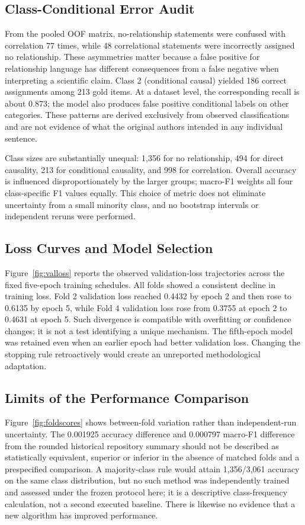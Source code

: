 \documentclass[conference]{IEEEtran}
\begin{document}
\subsection{Class-Conditional Error Audit}
From the pooled OOF matrix, no-relationship statements were confused with correlation 77 times, while 48 correlational statements were incorrectly assigned no relationship. These asymmetries matter because a false positive for relationship language has different consequences from a false negative when interpreting a scientific claim. Class 2 (conditional causal) yielded 186 correct assignments among 213 gold items. At a dataset level, the corresponding recall is about 0.873; the model also produces false positive conditional labels on other categories. These patterns are derived exclusively from observed classifications and are not evidence of what the original authors intended in any individual sentence.

Class sizes are substantially unequal: 1,356 for no relationship, 494 for direct causality, 213 for conditional causality, and 998 for correlation. Overall accuracy is influenced disproportionately by the larger groups; macro-F1 weights all four class-specific F1 values equally. This choice of metric does not eliminate uncertainty from a small minority class, and no bootstrap intervals or independent reruns were performed.

\subsection{Loss Curves and Model Selection}
Figure~\ref{fig:valloss} reports the observed validation-loss trajectories across the fixed five-epoch training schedules. All folds showed a consistent decline in training loss. Fold 2 validation loss reached 0.4432 by epoch 2 and then rose to 0.6135 by epoch 5, while Fold 4 validation loss rose from 0.3755 at epoch 2 to 0.4631 at epoch 5. Such divergence is compatible with overfitting or confidence changes; it is not a test identifying a unique mechanism. The fifth-epoch model was retained even when an earlier epoch had better validation loss. Changing the stopping rule retroactively would create an unreported methodological adaptation.

\subsection{Limits of the Performance Comparison}
Figure~\ref{fig:foldscores} shows between-fold variation rather than independent-run uncertainty. The 0.001925 accuracy difference and 0.000797 macro-F1 difference from the rounded historical repository summary should not be described as statistically equivalent, superior or inferior in the absence of matched folds and a prespecified comparison. A majority-class rule would attain 1,356/3,061 accuracy on the same class distribution, but no such method was independently trained and assessed under the frozen protocol here; it is a descriptive class-frequency calculation, not a second executed baseline. There is likewise no evidence that a new algorithm has improved performance.
\end{document}
